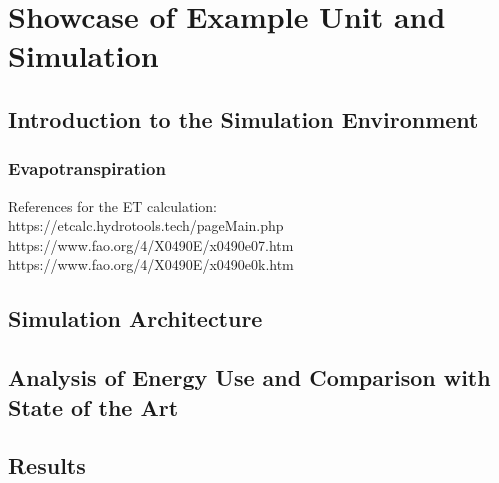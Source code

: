 \chapter{Showcase of Example Unit and Simulation}
\label{chap:simulation}
%
\section{Introduction to the Simulation Environment}
\subsection{Evapotranspiration}
References for the ET calculation:\\
https://etcalc.hydrotools.tech/pageMain.php\\
https://www.fao.org/4/X0490E/x0490e07.htm\\
https://www.fao.org/4/X0490E/x0490e0k.htm\\

\section{Simulation Architecture}
\section{Analysis of Energy Use and Comparison with State of the Art}
\section{Results}

